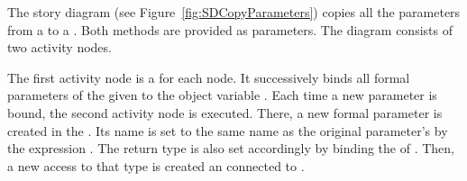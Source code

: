 The story diagram  (see Figure~\ref{fig:SDCopyParameters}) copies all the parameters from a  to a . Both methods are provided as parameters. The diagram consists of two activity nodes.

The first activity node is a for each node. It successively binds all formal parameters of the given  to the object variable . Each time a new parameter is bound, the second activity node is executed. There, a new formal parameter  is created in the . Its name is set to the same name as the original parameter's by the expression . The return type is also set accordingly by binding the  of . Then, a new access to that type is created an connected to .